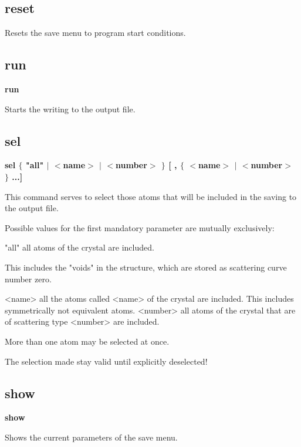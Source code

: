 \subsection*{reset}
\par
Resets the save menu to program start conditions. 
\subsection*{run}
{\bf run \par }
\par
\vspace{3pt}
Starts the writing to the output file. 
\subsection*{sel}
{\bf sel $ \{$ "all" $| $ $ <$name$> $ $| $ $ <$number$> $ $\} $ [ , $ \{$ $ <$name$> $ $| $ $ <$number$> $ $\} $ ...] \par }
\par
\vspace{3pt}
This command serves to select those atoms that will be included 
in the saving to the output file. 
\par
Possible values for the first mandatory parameter are mutually 
exclusively: 
\par
\begin{MacVerbatim}
"all"     all atoms of the crystal are included.
\end{MacVerbatim}
          This includes the "voids" in the structure, which are stored 
          as scattering curve number zero. 
\begin{MacVerbatim}
<name>    all the atoms called <name> of the crystal are included.
          This includes symmetrically not equivalent atoms.
<number>  all atoms of the crystal that are of scattering type <number>
          are included.
\end{MacVerbatim}
More than one atom may be selected at once. 
\par
The selection made stay valid until explicitly deselected! 
\subsection*{show}
{\bf show \par }
\par
\vspace{3pt}
Shows the current parameters of the save menu. 
